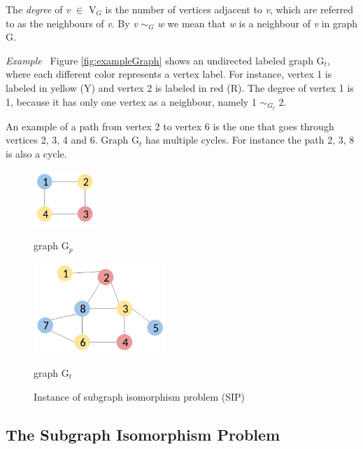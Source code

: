 \documentclass{l4proj}
\newcounter{example}[section]
\newenvironment{example}[1][]{\refstepcounter{example}\par\medskip
   \noindent \textit{Example~\theexample #1} \rmfamily}{\medskip}
\begin{document}
The \textit{degree} of \textit{v} $\in$ V$_{G}$ is the number of vertices adjacent to \textit{v}, which are referred to as the neighbours of \textit{v}. By \textit{v} $\sim_{G}$ \textit{w} we mean that \textit{w} is a neighbour of \textit{v} in graph G.
 
\begin{example}
Figure \ref{fig:exampleGraph} shows an undirected labeled graph G$_{t}$, where each different color represents a vertex label. For instance, vertex 1 is labeled in yellow (Y) and vertex 2 is labeled in red (R). The degree of vertex 1 is 1, because it has only one vertex as a neighbour, namely 1 $\sim_{G_{t}}$ 2. 

An example of a path from vertex 2 to vertex 6 is the one that goes through vertices 2, 3, 4 and 6. Graph G$_{t}$ has multiple cycles. For instance the path 2, 3, 8 is also a cycle.
\end{example}

\begin{figure}[H]
\centering
\begin{minipage}[t]{.4\textwidth}
  \centering
  \includegraphics[height=2.1cm,width=2.3cm]{images/graphs/exampleGraph2.png}
  \caption{graph G$_{p}$}
  \label{fig:exampleGraph2}
\end{minipage}%
\begin{minipage}[t]{.6\textwidth}
  \centering
  \includegraphics[height=3.4cm,width=5cm]{images/graphs/exampleGraph.png}
  \caption{graph G$_{t}$}
  \label{fig:exampleGraph}
\end{minipage}%
\caption{Instance of subgraph isomorphism problem (SIP)}
\label{fig:SIP}
\end{figure}

\subsection{The Subgraph Isomorphism Problem}
\end{document}
